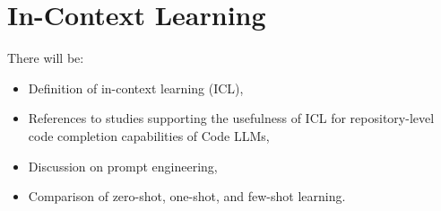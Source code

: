 \chapter{In-Context Learning}\label{chap:in-context-learning}

There will be:
\begin{itemize}
    \item Definition of in-context learning (ICL),
    \item References to studies supporting the usefulness of ICL for repository-level code completion capabilities of Code LLMs,
    \item Discussion on prompt engineering,
    \item Comparison of zero-shot, one-shot, and few-shot learning.
\end{itemize}
